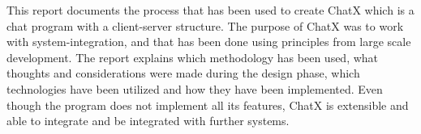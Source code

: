 This report documents the process that has been used to create ChatX which is a chat program with a client-server structure. The purpose of ChatX was to work with system-integration, and that has been done using principles from large scale development. The report explains which methodology has been used, what thoughts and considerations were made during the design phase, which technologies have been utilized and how they have been implemented. Even though the program does not implement all its features, ChatX is extensible and able to integrate and be integrated with further systems.




